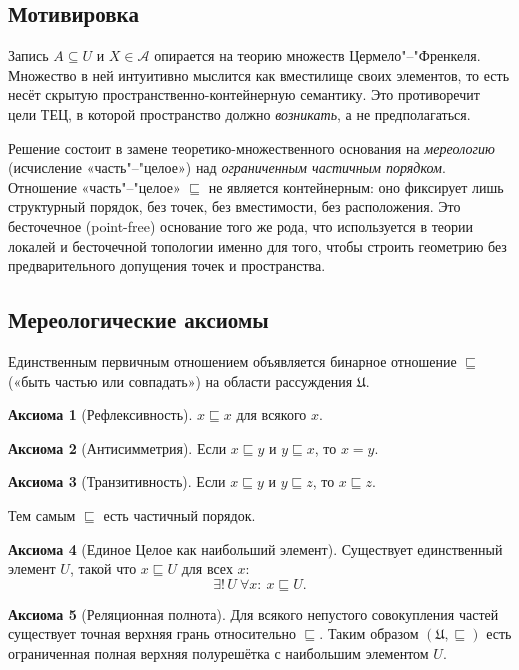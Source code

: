 \documentclass[12pt,a4paper]{article}
\theoremstyle{definition}
\newtheorem{axiom}{Аксиома}[section]
\theoremstyle{plain}
\theoremstyle{remark}
\newcommand{\Whole}{U}
\newcommand{\Parts}{\mathcal A}
\newcommand{\PartOf}{\sqsubseteq}
\begin{document}
\subsection{Мотивировка}

Запись $A\subseteq\Whole$ и $X\in\Parts$ опирается на теорию множеств Цермело"--"Френкеля.
Множество в ней интуитивно мыслится как вместилище своих элементов, то есть несёт
скрытую пространственно-контейнерную семантику. Это противоречит цели ТЕЦ, в
которой пространство должно \emph{возникать}, а не предполагаться.

Решение состоит в замене теоретико-множественного основания на \emph{мереологию}
(исчисление «часть"--"целое») над \emph{ограниченным частичным порядком}. Отношение
«часть"--"целое» $\PartOf$ не является контейнерным: оно фиксирует лишь
структурный порядок, без точек, без вместимости, без расположения. Это
бесточечное (point-free) основание того же рода, что используется в теории локалей
и бесточечной топологии именно для того, чтобы строить геометрию без
предварительного допущения точек и пространства.

\subsection{Мереологические аксиомы}

Единственным первичным отношением объявляется бинарное отношение $\PartOf$
(«быть частью или совпадать») на области рассуждения $\mathfrak U$.

\begin{axiom}[Рефлексивность]
$x\PartOf x$ для всякого $x$.
\end{axiom}

\begin{axiom}[Антисимметрия]
Если $x\PartOf y$ и $y\PartOf x$, то $x=y$.
\end{axiom}

\begin{axiom}[Транзитивность]
Если $x\PartOf y$ и $y\PartOf z$, то $x\PartOf z$.
\end{axiom}

Тем самым $\PartOf$ есть частичный порядок.

\begin{axiom}[Единое Целое как наибольший элемент]
Существует единственный элемент $\Whole$, такой что $x\PartOf\Whole$ для всех $x$:
\[
\exists!\,\Whole\ \forall x:\ x\PartOf\Whole.
\]
\end{axiom}

\begin{axiom}[Реляционная полнота]
Для всякого непустого совокупления частей существует точная верхняя грань
относительно $\PartOf$. Таким образом $(\mathfrak U,\PartOf)$ есть ограниченная
полная верхняя полурешётка с наибольшим элементом $\Whole$.
\end{axiom}
\end{document}

